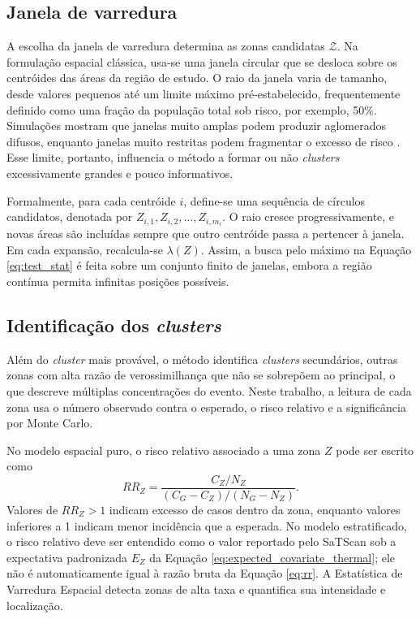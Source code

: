 \subsection{Janela de varredura}

A escolha da janela de varredura determina as zonas candidatas \(\mathcal{Z}\). Na formulação espacial clássica, usa-se uma janela circular que se desloca sobre os centróides das áreas da região de estudo. O raio da janela varia de tamanho, desde valores pequenos até um limite máximo pré-estabelecido, frequentemente definido como uma fração da população total sob risco, por exemplo, 50\%. Simulações mostram que janelas muito amplas podem produzir aglomerados difusos, enquanto janelas muito restritas podem fragmentar o excesso de risco \cite{ribeirocosta2012}. Esse limite, portanto, influencia o método a formar ou não \textit{clusters} excessivamente grandes e pouco informativos.

Formalmente, para cada centróide \(i\), define-se uma sequência de círculos candidatos, denotada por \(Z_{i,1}, Z_{i,2}, \dots, Z_{i,m_i}\). O raio cresce progressivamente, e novas áreas são incluídas sempre que outro centróide passa a pertencer à janela. Em cada expansão, recalcula-se \(\lambda(Z)\). Assim, a busca pelo máximo na Equação \eqref{eq:test_stat} é feita sobre um conjunto finito de janelas, embora a região contínua permita infinitas posições possíveis.

\subsection{Identificação dos \textit{clusters}}

Além do \textit{cluster} mais provável, o método identifica \textit{clusters} secundários, outras zonas com alta razão de verossimilhança que não se sobrepõem ao principal, o que descreve múltiplas concentrações do evento. Neste trabalho, a leitura de cada zona usa o número observado contra o esperado, o risco relativo e a significância por Monte Carlo.

No modelo espacial puro, o risco relativo associado a uma zona \(Z\) pode ser escrito como
\begin{equation}
RR_Z
=
\frac{C_Z/N_Z}{(C_G-C_Z)/(N_G-N_Z)}.
\label{eq:rr}
\end{equation}
Valores de \(RR_Z>1\) indicam excesso de casos dentro da zona, enquanto valores inferiores a 1 indicam menor incidência que a esperada. No modelo estratificado, o risco relativo deve ser entendido como o valor reportado pelo SaTScan sob a expectativa padronizada $E_Z$ da Equação \eqref{eq:expected_covariate_thermal}; ele não é automaticamente igual à razão bruta da Equação \eqref{eq:rr}. A Estatística de Varredura Espacial detecta zonas de alta taxa e quantifica sua intensidade e localização.

